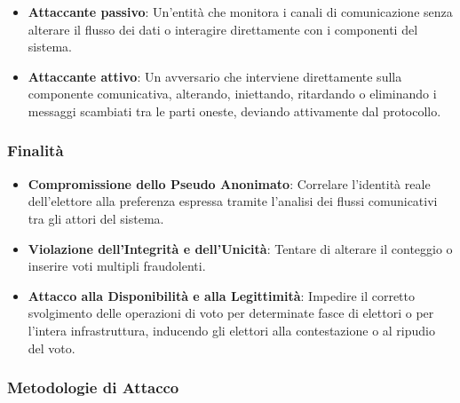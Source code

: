 \documentclass[a4paper,12pt]{article}
\begin{document}
\begin{itemize}
    \item \textbf{Attaccante passivo}: Un'entità che monitora i canali di comunicazione senza alterare il flusso dei dati o interagire direttamente con i componenti del sistema.

    \item \textbf{Attaccante attivo}: Un avversario che interviene direttamente sulla componente comunicativa, alterando, iniettando, ritardando o eliminando i messaggi scambiati tra le parti oneste, deviando attivamente dal protocollo.
\end{itemize}

\subsubsection*{Finalità}

\begin{itemize}
    \item \textbf{Compromissione dello Pseudo Anonimato}: Correlare l'identità reale dell'elettore alla preferenza espressa tramite l'analisi dei flussi comunicativi tra gli attori del sistema. 

    \item \textbf{Violazione dell'Integrità e dell'Unicità}: Tentare di alterare il conteggio o inserire voti multipli fraudolenti. 

    \item \textbf{Attacco alla Disponibilità e alla Legittimità}: Impedire il corretto svolgimento delle operazioni di voto per determinate fasce di elettori o per l'intera infrastruttura, inducendo gli elettori alla contestazione o al ripudio del voto. 
\end{itemize}

\subsubsection*{Metodologie di Attacco}
\end{document}
